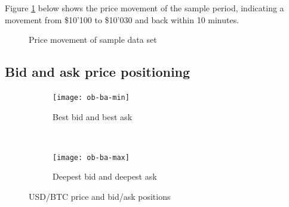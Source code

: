 Figure \ref{fig:data-price-movement} below shows the price movement of the sample period, indicating a movement from \$10'100 to \$10'030 and back within 10 minutes.

\begin{figure}[H]
    \centering
    \caption{Price movement of sample data set}
    \label{fig:data-price-movement}
\end{figure}

\subsection{Bid and ask price positioning}

\begin{figure}[H]
    \centering
    \begin{subfigure}[b]{0.45\textwidth}
        \texttt{[image: ob-ba-min]}
        \caption{Best bid and best ask}
        \label{fig:ob-ba-min}
    \end{subfigure}
    ~ %
    \begin{subfigure}[b]{0.45\textwidth}
        \texttt{[image: ob-ba-max]}
        \caption{Deepest bid and deepest ask}
        \label{fig:ob-ba-max}
    \end{subfigure}
    \caption{USD/BTC price and bid/ask positions}\label{fig:animals}
\end{figure}

